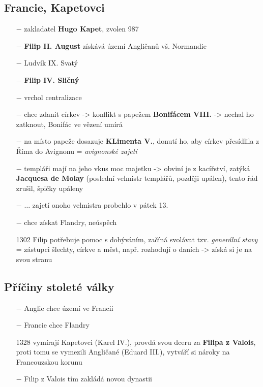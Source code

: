 \documentclass{article}
\begin{document}
\subsection*{Francie, Kapetovci}
\begin{itemize}
    \vspace{-0.5em}
    \setlength\itemsep{0.15em}
    \item[$-$] zakladatel \textbf{Hugo Kapet}, zvolen 987
    \item[$-$] \textbf{Filip II. August} získává území Angličanů vš. Normandie
    \item[$-$] Ludvík IX. Svatý
    \item[$-$] \textbf{Filip IV. Sličný}
    \item[$-$] vrchol centralizace
    \item[$-$] chce zdanit církev -> konflikt s papežem \textbf{Bonifácem VIII.} -> nechal ho zatknout, Bonifác ve vězení umírá
    \item[$-$] na místo papeže dosazuje \textbf{KLimenta V.}, donutí ho, aby církev přesídlila z Říma do Avignonu = \textit{avignonské zajetí}
    \item[$-$] templáři mají na jeho vkus moc majetku -> obviní je z kacířství, zatýká \textbf{Jacquesa de Molay} (poslední velmistr templářů, později upálen), tento řád zrušil, špičky upáleny
    \item[$-$]  $\dots$ zajetí onoho velmistra probehlo v pátek 13.
    \item[$-$] chce získat Flandry, neúspěch
    \item[1302] Filip potřebuje pomoc s dobýváním, začíná svolávat tzv. \textit{generální stavy} = zástupci šlechty, církve a měst, např. rozhodují o daních -> získá si je na svou stranu
\end{itemize}


\subsection*{Příčiny stoleté války}
\begin{itemize}
    \vspace{-0.5em}
    \setlength\itemsep{0.15em}
    \item[$-$] Anglie chce území ve Francii
    \item[$-$] Francie chce Flandry
    \item[1328] vymírají Kapetovci (Karel IV.), provdá svou dceru za \textbf{Filipa z Valois}, proti tomu se vymezili Angličané (Eduard III.), vytváří si nároky na Francouzskou korunu
    \item[$-$] Filip z Valois tím zakládá novou dynastii
\end{itemize}
\end{document}
